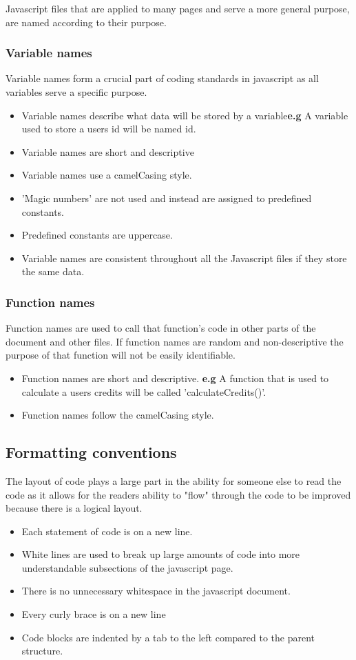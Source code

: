 \documentclass[11pt]{article}
\begin{document}
	Javascript files that are applied to many pages and serve a more general purpose, are named according to their purpose.
	\subsubsection{Variable names}
	Variable names form a crucial part of coding standards in javascript as all variables serve a specific purpose.
	\begin{itemize}
		\item Variable names describe what data will be stored by a variable\textbf{e.g} A variable used to store a users id will be named id.
		\item Variable names are short and descriptive
		\item Variable names use a camelCasing style.
		\item 'Magic numbers' are not used and instead are assigned to predefined constants.
		\item Predefined constants are uppercase.
		\item Variable names are consistent throughout all the Javascript files if they store the same data. 
	\end{itemize}
	\subsubsection{Function names}
	Function names are used to call that function's code in other parts of the document and other files. If function names are random and non-descriptive the purpose of that function will not be easily identifiable.
	\begin{itemize}
		\item Function names are short and descriptive. \textbf{e.g} A function that is used to calculate a users credits will be called 'calculateCredits()'.
		\item Function names follow the camelCasing style.
	\end{itemize}
	\subsection{Formatting conventions}
	The layout of code plays a large part in the ability for someone else to read the code as it allows for the readers ability to "flow" through the code to be improved because there is a logical layout.
	\begin{itemize}
		\item Each statement of code is on a new line.
		\item White lines are used to break up large amounts of code into more understandable subsections of the javascript page.
		\item There is no unnecessary whitespace in the javascript document.
		\item Every curly brace is on a new line
		\item Code blocks are indented by a tab to the left compared to the parent structure.
	\end{itemize}
\end{document}
